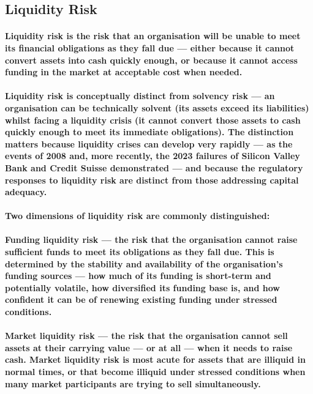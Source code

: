\subsection{Liquidity Risk}
\paragraph{\textbf{Liquidity risk} is the risk that an organisation will be unable to meet its financial obligations as they fall due — either because it cannot convert assets into cash quickly enough, or because it cannot access funding in the market at acceptable cost when needed.}
\paragraph{Liquidity risk is conceptually distinct from solvency risk — an organisation can be technically solvent (its assets exceed its liabilities) whilst facing a liquidity crisis (it cannot convert those assets to cash quickly enough to meet its immediate obligations). The distinction matters because liquidity crises can develop very rapidly — as the events of 2008 and, more recently, the 2023 failures of Silicon Valley Bank and Credit Suisse demonstrated — and because the regulatory responses to liquidity risk are distinct from those addressing capital adequacy.}
\paragraph{Two dimensions of liquidity risk are commonly distinguished:}
\paragraph{\textbf{Funding liquidity risk} — the risk that the organisation cannot raise sufficient funds to meet its obligations as they fall due. This is determined by the stability and availability of the organisation's funding sources — how much of its funding is short-term and potentially volatile, how diversified its funding base is, and how confident it can be of renewing existing funding under stressed conditions.}
\paragraph{\textbf{Market liquidity risk} — the risk that the organisation cannot sell assets at their carrying value — or at all — when it needs to raise cash. Market liquidity risk is most acute for assets that are illiquid in normal times, or that become illiquid under stressed conditions when many market participants are trying to sell simultaneously.}
